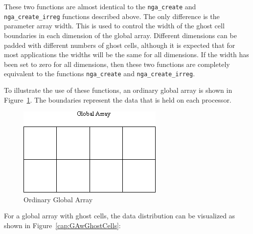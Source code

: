 These two functions are almost identical to the \texttt{nga\_create}
and \texttt{nga\_create\_irreg} functions described above. The only
difference is the parameter array width. This is used to control the
width of the ghost cell boundaries in each dimension of the global
array. Different dimensions can be padded with different numbers of
ghost cells, although it is expected that for most applications the
widths will be the same for all dimensions. If the width has been
set to zero for all dimensions, then these two functions are completely
equivalent to the functions \texttt{nga\_create} and \texttt{nga\_create\_irreg}. 

To illustrate the use of these functions, an ordinary global array
is shown in Figure~\ref{cap:OrdinaryGlobalArray}. The boundaries
represent the data that is held on each processor.

%
\begin{figure}
\begin{centering}
\includegraphics[width=0.9\columnwidth]{ghost003}
\par\end{centering}

\caption{\label{cap:OrdinaryGlobalArray}Ordinary Global Array}

\end{figure}


For a global array with ghost cells, the data distribution can be
visualized as shown in Figure~\ref{cap:GAwGhostCells}:

